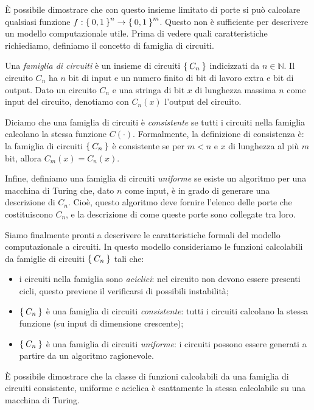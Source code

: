È possibile dimostrare che con questo insieme limitato di porte si può calcolare qualsiasi funzione $f : \Set{0,1}^n \rightarrow \Set{0,1}^m$. Questo non è sufficiente per descrivere un modello computazionale utile. Prima di vedere quali caratteristiche richiediamo, definiamo il concetto di famiglia di circuiti.

Una \emph{famiglia di circuiti} è un insieme di circuiti $\Set{C_n}$ indicizzati da $n\in\mathbb{N}$. Il circuito $C_n$ ha $n$ bit di input e un numero finito di bit di lavoro extra e bit di output. Dato un circuito $C_n$ e una stringa di bit $x$ di lunghezza massima $n$ come input del circuito, denotiamo con $C_n(x)$ l'output del circuito. 

Diciamo che una famiglia di circuiti è \emph{consistente} se tutti i circuiti nella famiglia calcolano la stessa funzione $C(\cdot)$. Formalmente, la definizione di consistenza è: la famiglia di circuiti $\Set{C_n}$ è consistente se per $m < n$ e $x$ di lunghezza al più $m$ bit, allora $C_m(x) = C_n(x)$. 

Infine, definiamo una famiglia di circuiti \emph{uniforme} se esiste un algoritmo per una macchina di Turing che, dato $n$ come input, è in grado di generare una descrizione di $C_n$. Cioè, questo algoritmo deve fornire l'elenco delle porte che costituiscono $C_n$, e la descrizione di come queste porte sono collegate tra loro.

Siamo finalmente pronti a descrivere le caratteristiche formali del modello computazionale a circuiti. In questo modello consideriamo le funzioni calcolabili da famiglie di circuiti $\Set{C_n}$ tali che:
\begin{itemize}
	\item i circuiti nella famiglia sono \emph{aciclici}: nel circuito non devono essere presenti cicli, questo previene il verificarsi di possibili instabilità;
	\item $\Set{C_n}$ è una famiglia di circuiti \emph{consistente}: tutti i circuiti calcolano la stessa funzione (su input di dimensione crescente);
	\item $\Set{C_n}$ è una famiglia di circuiti \emph{uniforme}: i circuiti possono essere generati a partire da un algoritmo ragionevole. 
\end{itemize}

È possibile dimostrare che la classe di funzioni calcolabili da una famiglia di circuiti consistente, uniforme e aciclica è esattamente la stessa calcolabile su una macchina di Turing.

